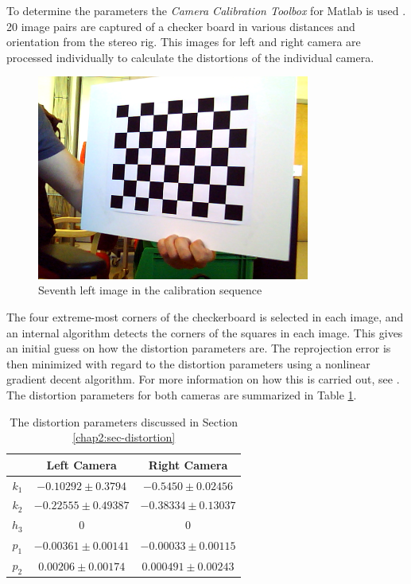 To determine the parameters the \emph{Camera Calibration Toolbox} for Matlab is used
\cite{camera-calib-toolbox}. 20 image pairs are captured of a checker board in various
distances and orientation from the stereo rig. This images for left and right camera are
processed individually to calculate the distortions of the individual camera. 
\begin{figure}[htbp]
    \centering
    \includegraphics[width=0.8\textwidth]{pics/left7}
    \caption{Seventh left image in the calibration sequence}
    \label{chap2:fig-checkerboard}
\end{figure}
The four extreme-most corners of the checkerboard is selected in each image, and an
internal algorithm detects the corners of the squares in each image. This gives an initial
guess on how the distortion parameters are. The reprojection error is then minimized with
regard to the distortion parameters using a nonlinear gradient decent algorithm. For more
information on how this is carried out, see \cite{heikkila}.
The distortion parameters for both cameras are summarized in Table
\ref{chap3:tab-distortion-coeffs}.
\begin{table}[htbp]
  \centering
    \begin{tabular}{|c|c|c|} 
        \hline
                & Left Camera       & Right Camera \\
        \hline
        $k_1$   & $-0.10292 \pm 0.3794$            & $-0.5450 \pm 0.02456$  \\
        $k_2$   & $-0.22555 \pm 0.49387$            & $-0.38334 \pm 0.13037$  \\
        $h_3$   & $ 0$                          & $0$                  \\
        \hline
        $p_1$   & $-0.00361 \pm 0.00141$    & $-0.00033 \pm 0.00115$ \\
        $p_2$   & $0.00206 \pm 0.00174$     & $ 0.000491 \pm 0.00243$  \\
        \hline
    \end{tabular}
    \caption{The distortion parameters discussed in Section \ref{chap2:sec-distortion}}
    \label{chap3:tab-distortion-coeffs}
\end{table}





